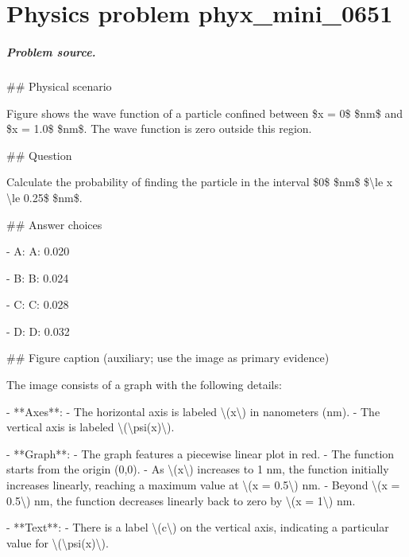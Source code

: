 
\chapter{Physics problem phyx\_mini\_0651}
\label{ch:PhyXMiniProblems_problem_phyx_mini_0651}

\paragraph{Problem source.}
\#\# Physical scenario

Figure shows the wave function of a particle confined between \$x = 0\$ \$nm\$ and \$x = 1.0\$ \$nm\$. The wave function is zero outside this region.

\#\# Question

Calculate the probability of finding the particle in the interval \$0\$ \$nm\$ \$\textbackslash{}le x \textbackslash{}le 0.25\$ \$nm\$.

\#\# Answer choices

- A: A: 0.020

- B: B: 0.024

- C: C: 0.028

- D: D: 0.032

\#\# Figure caption (auxiliary; use the image as primary evidence)

The image consists of a graph with the following details:

- **Axes**: 
  - The horizontal axis is labeled \textbackslash{}(x\textbackslash{}) in nanometers (nm).
  - The vertical axis is labeled \textbackslash{}(\textbackslash{}psi(x)\textbackslash{}).

- **Graph**:
  - The graph features a piecewise linear plot in red.
  - The function starts from the origin (0,0).
  - As \textbackslash{}(x\textbackslash{}) increases to 1 nm, the function initially increases linearly, reaching a maximum value at \textbackslash{}(x = 0.5\textbackslash{}) nm.
  - Beyond \textbackslash{}(x = 0.5\textbackslash{}) nm, the function decreases linearly back to zero by \textbackslash{}(x = 1\textbackslash{}) nm.

- **Text**:
  - There is a label \textbackslash{}(c\textbackslash{}) on the vertical axis, indicating a particular value for \textbackslash{}(\textbackslash{}psi(x)\textbackslash{}).

